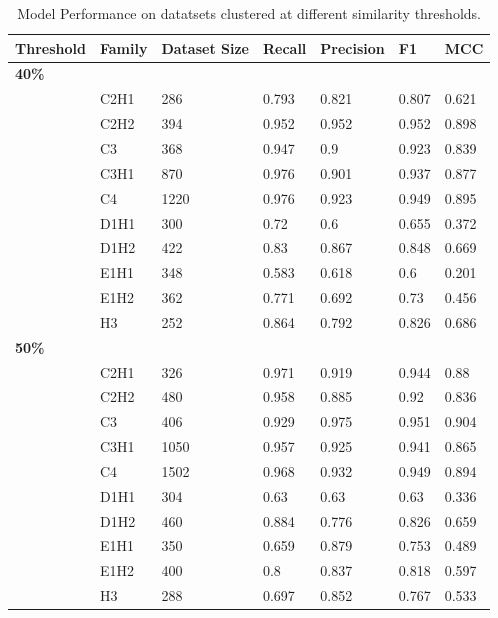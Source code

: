 \begin{table}
\tiny
  \caption{\label{tab:thresholds}Model Performance on datatsets clustered at different similarity thresholds.}
\begin{center}
\begin{tabular}{lllllll} \hline
Threshold  &  Family & Dataset Size & Recall & Precision & F1    &  MCC    \\ \hline
{\bfseries 40\%}  &  \\
&  C2H1 &  286  &  0.793 &  0.821 &  0.807 &  0.621 \\
&  C2H2 &  394  &  0.952 &  0.952 &  0.952 &  0.898 \\
&  C3   &  368  &  0.947 &  0.9   &  0.923 &  0.839 \\
&  C3H1 &  870  &  0.976 &  0.901 &  0.937 &  0.877 \\
&  C4   &  1220 &  0.976 &  0.923 &  0.949 &  0.895 \\
&  D1H1 &  300  &  0.72  &  0.6   &  0.655 &  0.372 \\
&  D1H2 &  422  &  0.83  &  0.867 &  0.848 &  0.669 \\
&  E1H1 &  348  &  0.583 &  0.618 &  0.6   &  0.201 \\
&  E1H2 &  362  &  0.771 &  0.692 &  0.73  &  0.456 \\
&  H3   &  252  &  0.864 &  0.792 &  0.826 &  0.686 \\  \hline

{\bfseries 50\%} &             \\                               
& C2H1 &  326  &  0.971 &  0.919 &  0.944 &  0.88  \\
& C2H2 &  480  &  0.958 &  0.885 &  0.92  &  0.836 \\
& C3   &  406  &  0.929 &  0.975 &  0.951 &  0.904 \\
& C3H1 &  1050 &  0.957 &  0.925 &  0.941 &  0.865 \\
& C4   &  1502 &  0.968 &  0.932 &  0.949 &  0.894 \\
& D1H1 &  304  &  0.63  &  0.63  &  0.63  &  0.336 \\
& D1H2 &  460  &  0.884 &  0.776 &  0.826 &  0.659 \\
& E1H1 &  350  &  0.659 &  0.879 &  0.753 &  0.489 \\
& E1H2 &  400  &  0.8   &  0.837 &  0.818 &  0.597 \\
& H3   &  288  &  0.697 &  0.852 &  0.767 &  0.533 \\  \hline


\end{tabular}
\end{center}
\end{table}
